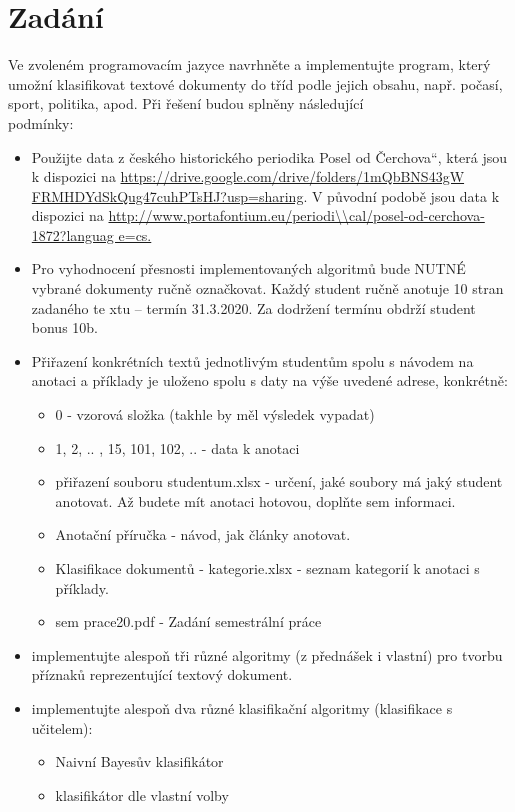 \documentclass[12pt]{article}
\begin{document}
\section{Zadání}
Ve zvoleném programovacím jazyce navrhněte a implementujte program, který umožní klasifikovat textové dokumenty do tříd podle jejich obsahu, např. počasí,     sport, politika, apod. Při řešení budou splněny následující \\
podmínky:
\begin{itemize}

\item Použijte data z českého historického periodika Posel od Čerchova“, která jsou k dispozici na \url{https://drive.google.com/drive/folders/1mQbBNS43gW    FRMHDYdSkQug47cuhPTsHJ?usp=sharing}. V původní podobě jsou data k dispozici na \url{http://www.portafontium.eu/periodi\\cal/posel-od-cerchova-1872?languag    e=cs.}

\item Pro vyhodnocení přesnosti implementovaných algoritmů bude NUTNÉ vybrané dokumenty ručně označkovat. Každý student ručně anotuje 10 stran zadaného te    xtu –
termín 31.3.2020. Za dodržení termínu obdrží student bonus 10b.

\item Přiřazení konkrétních textů jednotlivým studentům spolu s návodem na anotaci a příklady je uloženo spolu s daty na výše uvedené adrese, konkrétně:
        \begin{itemize}
        \item 0 - vzorová složka (takhle by měl výsledek vypadat)
        \item 1, 2, .. , 15, 101, 102, .. - data k anotaci
        \item přiřazení souboru studentum.xlsx - určení, jaké soubory má jaký student   anotovat. Až budete mít anotaci hotovou, doplňte sem informaci.
        \item Anotační příručka - návod, jak články anotovat.
        \item Klasifikace dokumentů - kategorie.xlsx - seznam kategorií k anotaci s příklady.
        \item sem prace20.pdf - Zadání semestrální práce
        \end{itemize}

\item implementujte alespoň tři různé algoritmy (z přednášek i vlastní) pro tvorbu příznaků reprezentující textový dokument.

\item implementujte alespoň dva různé klasifikační algoritmy (klasifikace s učitelem):
        \begin{itemize}
        \item Naivní Bayesův klasifikátor
        \item klasifikátor dle vlastní volby
        \end{itemize}


\end{itemize}
\end{document}
